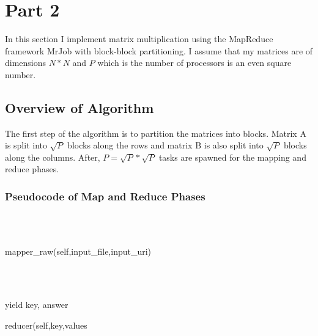 \documentclass[12pt, a4paper, fleqn, titlepage]{article}
\begin{document}
\section*{Part 2}
In this section I implement matrix multiplication using the MapReduce framework MrJob with block-block partitioning. I assume that my matrices are of dimensions $N * N$ and $P $ which is the number of processors is an even square number.
\subsection*{Overview of Algorithm}
    The first step of the algorithm is to partition the matrices into blocks. Matrix A is split into $\sqrt{P}$ blocks along the rows and matrix B is also split into $\sqrt{P}$ blocks along the columns. After, $P = \sqrt{P} * \sqrt{P}$ tasks are spawned for the mapping and reduce phases.
\subsubsection*{Pseudocode of Map and Reduce Phases}
    \begin{algorithm}[H]
        \\
        \\
        \linebreak


        \begin{center}
            \caption{mapper\_raw(self,input\_file,input\_uri)}
        \end{center}
    \end{algorithm} 

    \begin{algorithm}[H]
        \\
        \\
        \linebreak


        yield key, answer
        \begin{center}
            \caption{reducer(self,key,values}
        \end{center}
    \end{algorithm} 
\end{document}
